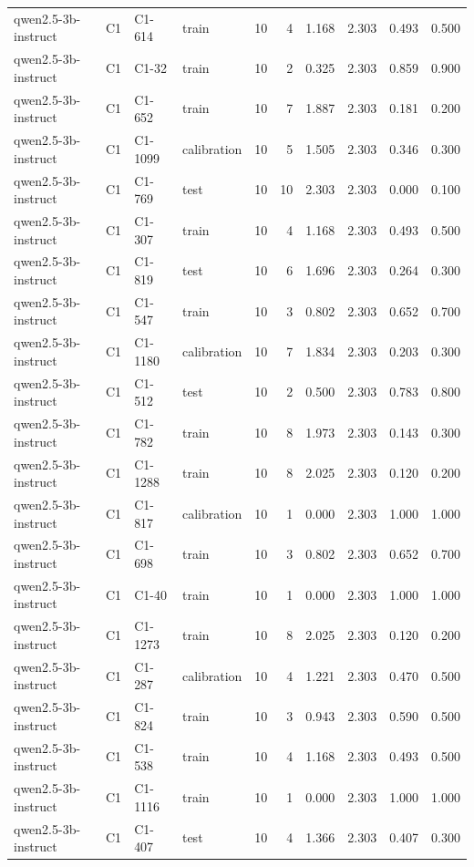 \begin{table}
\begin{tabular}{llllrrrrrr}
qwen2.5-3b-instruct & C1 & C1-614 & train & 10 & 4 & 1.168 & 2.303 & 0.493 & 0.500 \\
qwen2.5-3b-instruct & C1 & C1-32 & train & 10 & 2 & 0.325 & 2.303 & 0.859 & 0.900 \\
qwen2.5-3b-instruct & C1 & C1-652 & train & 10 & 7 & 1.887 & 2.303 & 0.181 & 0.200 \\
qwen2.5-3b-instruct & C1 & C1-1099 & calibration & 10 & 5 & 1.505 & 2.303 & 0.346 & 0.300 \\
qwen2.5-3b-instruct & C1 & C1-769 & test & 10 & 10 & 2.303 & 2.303 & 0.000 & 0.100 \\
qwen2.5-3b-instruct & C1 & C1-307 & train & 10 & 4 & 1.168 & 2.303 & 0.493 & 0.500 \\
qwen2.5-3b-instruct & C1 & C1-819 & test & 10 & 6 & 1.696 & 2.303 & 0.264 & 0.300 \\
qwen2.5-3b-instruct & C1 & C1-547 & train & 10 & 3 & 0.802 & 2.303 & 0.652 & 0.700 \\
qwen2.5-3b-instruct & C1 & C1-1180 & calibration & 10 & 7 & 1.834 & 2.303 & 0.203 & 0.300 \\
qwen2.5-3b-instruct & C1 & C1-512 & test & 10 & 2 & 0.500 & 2.303 & 0.783 & 0.800 \\
qwen2.5-3b-instruct & C1 & C1-782 & train & 10 & 8 & 1.973 & 2.303 & 0.143 & 0.300 \\
qwen2.5-3b-instruct & C1 & C1-1288 & train & 10 & 8 & 2.025 & 2.303 & 0.120 & 0.200 \\
qwen2.5-3b-instruct & C1 & C1-817 & calibration & 10 & 1 & 0.000 & 2.303 & 1.000 & 1.000 \\
qwen2.5-3b-instruct & C1 & C1-698 & train & 10 & 3 & 0.802 & 2.303 & 0.652 & 0.700 \\
qwen2.5-3b-instruct & C1 & C1-40 & train & 10 & 1 & 0.000 & 2.303 & 1.000 & 1.000 \\
qwen2.5-3b-instruct & C1 & C1-1273 & train & 10 & 8 & 2.025 & 2.303 & 0.120 & 0.200 \\
qwen2.5-3b-instruct & C1 & C1-287 & calibration & 10 & 4 & 1.221 & 2.303 & 0.470 & 0.500 \\
qwen2.5-3b-instruct & C1 & C1-824 & train & 10 & 3 & 0.943 & 2.303 & 0.590 & 0.500 \\
qwen2.5-3b-instruct & C1 & C1-538 & train & 10 & 4 & 1.168 & 2.303 & 0.493 & 0.500 \\
qwen2.5-3b-instruct & C1 & C1-1116 & train & 10 & 1 & 0.000 & 2.303 & 1.000 & 1.000 \\
qwen2.5-3b-instruct & C1 & C1-407 & test & 10 & 4 & 1.366 & 2.303 & 0.407 & 0.300 \\

\end{tabular}
\end{table}
